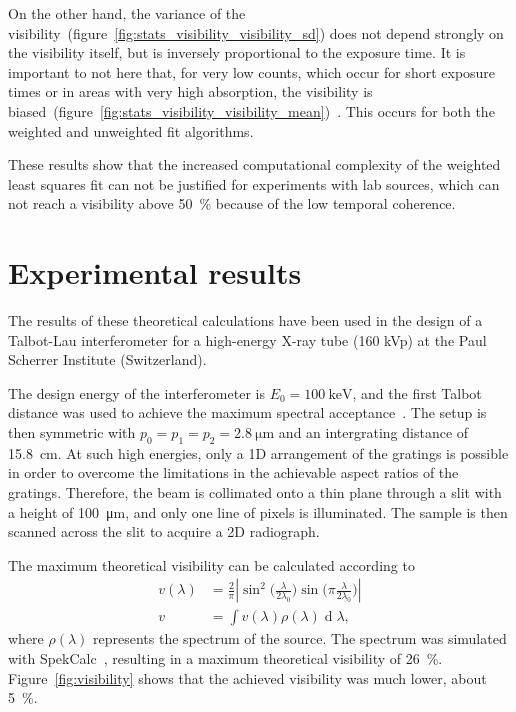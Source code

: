 \documentclass[a4paper]{spie}
\newcommand{\de}[1]{\ensuremath{\operatorname{d}\!{#1}}}
\begin{document}
On the other hand, the variance of the
visibility~(figure~\ref{fig:stats_visibility_visibility_sd}) does not depend
strongly on the visibility itself, but is inversely proportional to the
exposure time. It is important to not here that, for very
low counts, which occur for short exposure times or in areas with very high
absorption, the visibility is
biased~(figure~\ref{fig:stats_visibility_visibility_mean})~\cite{Chabior2011}.
This occurs for both the weighted and unweighted fit algorithms.

These results show that the increased computational complexity of the
weighted least squares fit can not be justified for experiments with lab
sources, which can not reach a visibility above \SI{50}{\percent} because of
the low temporal coherence.

\section{Experimental results}
The results of these theoretical calculations have been used
in the design of a Talbot-Lau interferometer for a high-energy X-ray tube
(160 kVp) at the Paul Scherrer Institute (Switzerland).

The design energy of the interferometer is $E_0 = \SI{100}{\kilo\eV}$, and the first
Talbot distance was used to achieve the maximum spectral
acceptance~\cite{Weitkamp2005}. The setup is then symmetric with $p_0 = p_1
= p_2 = \SI{2.8}{\micro\meter}$ and an intergrating distance of
\SI{15.8}{\centi\meter}. At such high energies, only a 1D arrangement of the
gratings is possible in order to overcome the limitations in the achievable
aspect ratios of the gratings. Therefore, the beam is collimated onto a thin
plane through a slit with a height of \SI{100}{\micro\meter}, and only one
line of pixels is illuminated. The sample is then scanned across the slit to
acquire a 2D radiograph.

The maximum theoretical visibility can be calculated according
to~\cite{Thuering2014}
\begin{align*}
    v(\lambda) &= \frac{2}{\pi}\left| \sin^2
    \Big(\frac{\lambda}{2\lambda_0}\Big) \sin
    \Big(\pi\frac{\lambda}{2\lambda_0}\Big)\right| \\
    v &= \int v(\lambda) \rho(\lambda) \de \lambda,
\end{align*}
where $\rho(\lambda)$ represents the spectrum of the source. The spectrum
was simulated with SpekCalc~\cite{Poludniowski2009}, resulting in a maximum
theoretical visibility of \SI{26}{\percent}. Figure~\ref{fig:visibility}
shows that the achieved visibility was much lower, about \SI{5}{\percent}.
\end{document}
